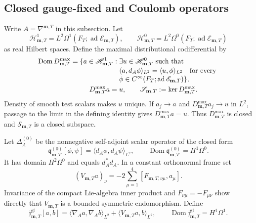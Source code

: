 \subsection{Closed gauge-fixed and Coulomb operators}

Write \(A=\nabla^{\mathbf m,T}\) in this subsection.  Let
\begin{equation}
 \mathscr H_{\mathbf m,T}^1
 =L^2\Omega^1(F_T;\operatorname{ad}\mathscr E_{\mathbf m,T}),
 \qquad
 \mathscr H_{\mathbf m,T}^0
 =L^2\Omega^0(F_T;\operatorname{ad}\mathscr E_{\mathbf m,T})
 \label{cusp-native-full-flux-suN-real-Hilbert-spaces}
\end{equation}
as real Hilbert spaces.  Define the maximal distributional codifferential
by
\begin{align}
 \operatorname{Dom}D_{\mathbf m,T}^{\max}
 =\{a\in\mathscr H_{\mathbf m,T}^1:\;&
 \exists u\in\mathscr H_{\mathbf m,T}^0\text{ such that}\notag\\[-1mm]
 &\langle a,d_A\phi\rangle_{L^2}
 =\langle u,\phi\rangle_{L^2}
 \quad\text{for every }\notag\\[-1mm]
 &\phi\in C^\infty(F_T;\operatorname{ad}\mathscr E_{\mathbf m,T})\},
 \label{cusp-native-full-flux-suN-max-codiff-domain}\\
 D_{\mathbf m,T}^{\max}a={}&u,
 \qquad
 \mathscr S_{\mathbf m,T}:=\ker D_{\mathbf m,T}^{\max}.
 \label{cusp-native-full-flux-suN-Coulomb-slice}
\end{align}
Density of smooth test scalars makes \(u\) unique.  If
\(a_j\to a\) and \(D_{\mathbf m,T}^{\max}a_j\to u\) in \(L^2\), passage to
the limit in the defining identity gives
\(D_{\mathbf m,T}^{\max}a=u\).  Thus \(D_{\mathbf m,T}^{\max}\) is closed
and \(\mathscr S_{\mathbf m,T}\) is a closed subspace.

Let \(\Delta_A^{(0)}\) be the nonnegative self-adjoint scalar operator of
the closed form
\begin{equation}
 \mathfrak q_{\mathbf m,T}^{(0)}[\phi,\psi]
 =\langle d_A\phi,d_A\psi\rangle_{L^2},
 \qquad
 \operatorname{Dom}\mathfrak q_{\mathbf m,T}^{(0)}=H^1\Omega^0.
 \label{cusp-native-full-flux-suN-scalar-form}
\end{equation}
It has domain \(H^2\Omega^0\) and equals \(d_A^*d_A\).  In a constant
orthonormal frame set
\begin{equation}
 (V_{\mathbf m,T}a)_\nu
 =-2\sum_{\mu=1}^4[F_{\mathbf m,T,\nu\mu},a_\mu].
 \label{cusp-native-full-flux-suN-spin-endomorphism}
\end{equation}
Invariance of the compact Lie-algebra inner product and
\(F_{\nu\mu}=-F_{\mu\nu}\) show directly that \(V_{\mathbf m,T}\) is a
bounded symmetric endomorphism.  Define
\begin{equation}
 \mathfrak j_{\mathbf m,T}^{\mathrm{gf}}[a,b]
 =\langle\nabla_A a,\nabla_A b\rangle_{L^2}
  +\langle V_{\mathbf m,T}a,b\rangle_{L^2},
 \qquad
 \operatorname{Dom}\mathfrak j_{\mathbf m,T}^{\mathrm{gf}}
 =H^1\Omega^1.
 \label{cusp-native-full-flux-suN-Jacobi-form}
\end{equation}

